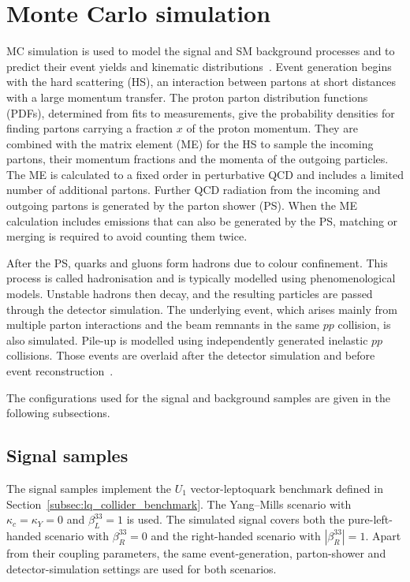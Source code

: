 \section{Monte Carlo simulation}
MC simulation is used to model the signal and SM background processes and to predict their event yields and kinematic distributions~\cite{Buckley2011EventGenerators}.
Event generation begins with the hard scattering (HS), an interaction between partons at short distances with a large momentum transfer.
The proton parton distribution functions (PDFs), determined from fits to measurements, give the probability densities for finding partons carrying a fraction $x$ of the proton momentum.
They are combined with the matrix element (ME) for the HS to sample the incoming partons, their momentum fractions and the momenta of the outgoing particles.
The ME is calculated to a fixed order in perturbative QCD and includes a limited number of additional partons.
Further QCD radiation from the incoming and outgoing partons is generated by the parton shower (PS).
When the ME calculation includes emissions that can also be generated by the PS, matching or merging is required to avoid counting them twice.

After the PS, quarks and gluons form hadrons due to colour confinement.
This process is called hadronisation and is typically modelled using phenomenological models. Unstable hadrons then decay, and the resulting particles are passed through the detector simulation.
The underlying event, which arises mainly from multiple parton interactions and the beam remnants in the same $pp$ collision, is also simulated.
Pile-up is modelled using independently generated inelastic $pp$ collisions.
Those events are overlaid after the detector simulation and before event reconstruction~\cite{ATLAS2022PileupOverlay}.

The configurations used for the signal and background samples are given in the following subsections.


\subsection{Signal samples}
\label{subsec:signal_samples}

The signal samples implement the $U_{1}$ vector-leptoquark benchmark defined in Section~\ref{subsec:lq_collider_benchmark}. The Yang--Mills scenario with $\kappa_c=\kappa_Y=0$ and $\beta_L^{33}=1$ is used.
The simulated signal covers both the pure-left-handed scenario with $\beta_R^{33}=0$ and the right-handed scenario with $|\beta_R^{33}|=1$.
Apart from their coupling parameters, the same event-generation, parton-shower and detector-simulation settings are used for both scenarios.

